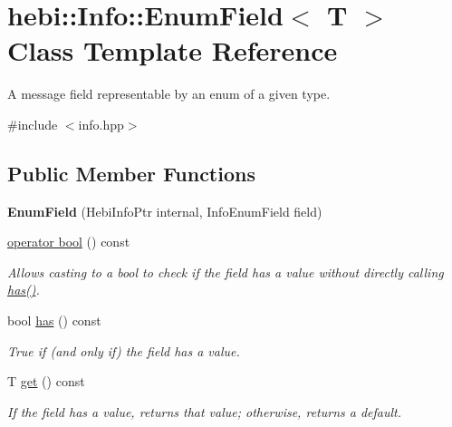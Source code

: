 \hypertarget{classhebi_1_1Info_1_1EnumField}{}\section{hebi\+:\+:Info\+:\+:Enum\+Field$<$ T $>$ Class Template Reference}
\label{classhebi_1_1Info_1_1EnumField}


A message field representable by an enum of a given type.  




{\ttfamily \#include $<$info.\+hpp$>$}

\subsection*{Public Member Functions}
\begin{DoxyCompactItemize}
\item 
\mbox{\label{classhebi_1_1Info_1_1EnumField_ad4680cb2ff477ed2dfb4ae47f0fd6836}} 
{\bfseries Enum\+Field} (Hebi\+Info\+Ptr internal, Info\+Enum\+Field field)
\item 
\hyperlink{classhebi_1_1Info_1_1EnumField_ac1690565ae2d937a18f9c39e3b1111ed}{operator bool} () const
\begin{DoxyCompactList}\small\item\em Allows casting to a bool to check if the field has a value without directly calling {\ttfamily \hyperlink{classhebi_1_1Info_1_1EnumField_a1c8fe912ecc7e5d7f8f3d8f0fa346ba9}{has()}}. \end{DoxyCompactList}\item 
\mbox{\label{classhebi_1_1Info_1_1EnumField_a1c8fe912ecc7e5d7f8f3d8f0fa346ba9}} 
bool \hyperlink{classhebi_1_1Info_1_1EnumField_a1c8fe912ecc7e5d7f8f3d8f0fa346ba9}{has} () const
\begin{DoxyCompactList}\small\item\em True if (and only if) the field has a value. \end{DoxyCompactList}\item 
\mbox{\label{classhebi_1_1Info_1_1EnumField_adbb07d48e17f3ec031bfc5a24c810cf2}} 
T \hyperlink{classhebi_1_1Info_1_1EnumField_adbb07d48e17f3ec031bfc5a24c810cf2}{get} () const
\begin{DoxyCompactList}\small\item\em If the field has a value, returns that value; otherwise, returns a default. \end{DoxyCompactList}\end{DoxyCompactItemize}


